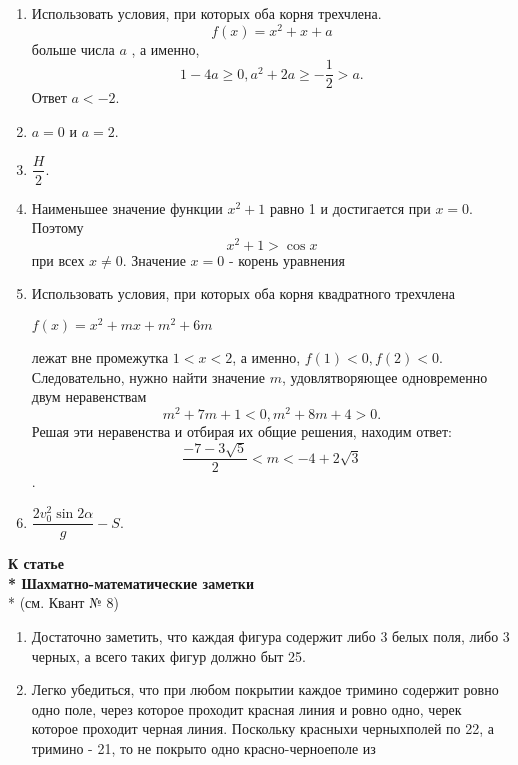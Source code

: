 \begin{multicols}{2}
\begin{enumerate}[label=\textbf{\arabic*.},start=4]
\addtolength{\itemindent}{1.5cm}
\setlength\itemsep{1pt}
\item  Использовать условия, при которых оба корня трехчлена.
$$  f(x)=x^2+x+a $$
больше числа $a$  , а именно,
$$1-4a\geq 0, a^2+2a \geq -\dfrac{1}{2}>a.$$
Ответ $ a<-2.$
\item $a=0$ и $a=2$.
\item $\dfrac{H}{2}.$
\item Наименьшее значение функции $x^2+1$ равно 1 и достигается при $x=0$. Поэтому
$$x^2+1>\cos{x}$$
при всех $x\neq 0$. Значение $x=0$ - корень уравнения
\item Использовать условия, при которых оба корня квадратного трехчлена
\begin{center}
$f(x)=x^2+mx+m^2+6m$
\end{center}
лежат вне промежутка $1<x<2$, а именно, $f(1)<0, f(2)<0$.\\
Следовательно, нужно найти значение $m$, удовлятворяющее одновременно двум неравенствам
\begin{equation}
	m^2+7m+1<0,
	m^2+8m+4>0.
\end{equation}
Решая эти неравенства и отбирая их общие решения, находим ответ:
$$\dfrac{-7-3\sqrt{5}}{2}<m<-4+2\sqrt{3}$$.
\item $\dfrac{2v_0^2\sin{2\alpha}}{g}-S $.
\end{enumerate}
\begin{center}
\addtolength{\parindent}{1.5cm}
\color{red}
\textbf{
К статье \\*
\flqq Шахматно-математические заметки\frqq } \\*
(см. Квант № 8)
\end{center}
\begin{enumerate}[label=\textbf{\arabic*.},start=1]
\setlength\itemsep{1pt}
\addtolength{\itemindent}{1.5cm}
\item Достаточно заметить, что каждая фигура содержит либо 3 белых поля, либо 3 черных, а всего таких фигур должно быт 25.
\item Легко убедиться, что при любом покрытии каждое тримино содержит ровно одно поле, через которое проходит красная линия и ровно одно, черек которое проходит черная линия. Поскольку \flqq красных\frqq  и \flqq черных\frqq  полей по 22, а тримино - 21, то не покрыто одно \flqq красно-черное\frqq  поле из 

\end{enumerate}
\end{multicols}
